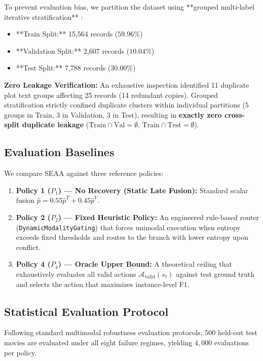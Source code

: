 \documentclass[journal]{IEEEtran}
\begin{document}
To prevent evaluation bias, we partition the dataset using **grouped multi-label iterative stratification** \cite{sechidis2011stratification}:
\begin{itemize}
    \item **Train Split:** 15,564 records ($59.96\%$)
    \item **Validation Split:** 2,607 records ($10.04\%$)
    \item **Test Split:** 7,788 records ($30.00\%$)
\end{itemize}
\textbf{Zero Leakage Verification:} An exhaustive inspection identified 11 duplicate plot text groups affecting 25 records (14 redundant copies). Grouped stratification strictly confined duplicate clusters within individual partitions ($5$ groups in Train, $3$ in Validation, $3$ in Test), resulting in \textbf{exactly zero cross-split duplicate leakage} ($\text{Train} \cap \text{Val} = \emptyset$, $\text{Train} \cap \text{Test} = \emptyset$).

\subsection{Evaluation Baselines}
We compare SEAA against three reference policies:
\begin{enumerate}
    \item \textbf{Policy 1 ($P_1$) --- No Recovery (Static Late Fusion):} Standard scalar fusion $\hat{p} = 0.55 \hat{p}^T + 0.45 \hat{p}^V$.
    \item \textbf{Policy 2 ($P_2$) --- Fixed Heuristic Policy:} An engineered rule-based router (\texttt{DynamicModalityGating}) that forces unimodal execution when entropy exceeds fixed thresholds and routes to the branch with lower entropy upon conflict.
    \item \textbf{Policy 4 ($P_4$) --- Oracle Upper Bound:} A theoretical ceiling that exhaustively evaluates all valid actions $\mathcal{A}_{\text{valid}}(s_t)$ against test ground truth and selects the action that maximizes instance-level F1.
\end{enumerate}

\subsection{Statistical Evaluation Protocol}
Following standard multimodal robustness evaluation protocols, $500$ held-out test movies are evaluated under all eight failure regimes, yielding $4,000$ evaluations per policy. 
\end{document}
